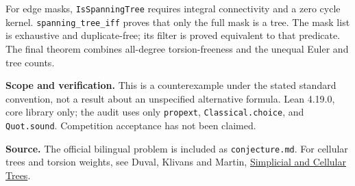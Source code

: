\documentclass[11pt]{article}
\begin{document}
For edge masks, \texttt{IsSpanningTree} requires integral connectivity
and a zero cycle kernel. \texttt{spanning\_tree\_iff} proves that only the full
mask is a tree. The mask list is exhaustive and duplicate-free; its filter
is proved equivalent to that predicate. The final theorem combines
all-degree torsion-freeness and the unequal Euler and tree counts.

\textbf{Scope and verification.} This is a counterexample under the stated
standard convention, not a result about an unspecified alternative formula.
Lean 4.19.0, core library only; the audit uses only \texttt{propext},
\texttt{Classical.choice}, and \texttt{Quot.sound}. Competition acceptance
has not been claimed.

\textbf{Source.} The official bilingual problem is included as
\texttt{conjecture.md}. For cellular trees and torsion weights, see
Duval, Klivans and Martin,
\href{https://jlmartin.ku.edu/papers/TreesChapter.pdf}{Simplicial and Cellular Trees}.
\end{document}
